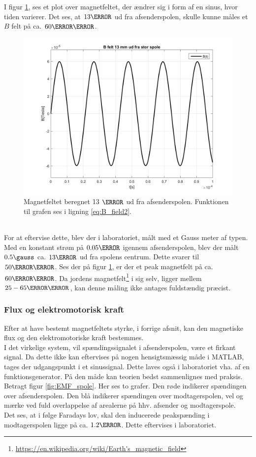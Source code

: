 I figur \ref{fig:B_felt_stor_spole}, ses et plot over magnetfeltet, der ændrer sig i form af en sinus, hvor tiden varierer.
Det ses, at $13\mm$ ud fra afsenderspolen, skulle kunne måles et $B$ felt på ca. $60\micro\tesla$.\\
\begin{figure}[h!]
	\centering
	\includegraphics[width=1\textwidth]{billeder/B_felt_stor_spole.png}
	\caption{Magnetfeltet beregnet 13 $\mm$ ud fra afsenderspolen. Funktionen til grafen ses i ligning \ref{eq:B_field2}.}
	\label{fig:B_felt_stor_spole}
\end{figure}\\
For at eftervise dette, blev der i laboratoriet, målt med et Gauss meter af typen. 
Med en konstant strøm på $0.05\ampere$ igennem afsenderspolen, blev der målt $0.5 \gauss$ ca. $13\mm$ ud fra spolens centrum. 
Dette svarer til $50 \micro\tesla$. 
Ses der på figur \ref{fig:B_felt_stor_spole}, er der et peak magnetfelt på ca. $60\micro\tesla$.
Da jordens magnetfelt\footnote{\url{https://en.wikipedia.org/wiki/Earth's_magnetic_field}} i sig selv, ligger mellem $25-65\micro\tesla$, kan denne måling ikke antages fuldstændig præcist.

\subsubsection{Flux og elektromotorisk kraft}
Efter at have bestemt magnetfeltets styrke, i forrige afsnit, kan den magnetiske flux og den elektromotoriske kraft bestemmes.\\
I det virkelige system, vil spændingssignalet i afsenderspolen, være et firkant signal.
Da dette ikke kan eftervises på nogen hensigtsmæssig måde i MATLAB, tages der udgangspunkt i et sinussignal.
Dette laves også i laboratoriet vha. af en funktionsgenerator.
På den måde kan teorien bedst sammenlignes med praksis.\\
Betragt figur \ref{fig:EMF_spole}. Her ses to grafer.
Den røde indikerer spændingen over afsenderspolen.
Den blå indikerer spændingen over modtagerspolen, vel og mærke ved fuld overlappelse af arealerne på hhv. afsender og modtagerspole.\\
Det ses, at i følge Faradays lov, skal den inducerede peakspænding i modtagerspolen ligge på ca. $1.2\volt$.
Dette eftervises i laboratoriet.

